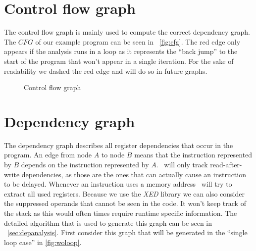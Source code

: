 \section{Control flow graph}
The control flow graph is mainly used to compute the correct dependency graph. The $CFG$ of our example program can be seen in ~\autoref{fig:cfg}. The red edge only appears if the analysis runs in a loop as it represents the ``back jump'' to the start of the program that won't appear in a single iteration. For the sake of readability we dashed the red edge and will do so in future graphs.

\begin{figure}
    \centering
    \caption{Control flow graph}
    \label{fig:cfg}
\end{figure}

\FloatBarrier

\section{Dependency graph}
The dependency graph describes all register dependencies that occur in the program. An edge from node $A$ to node $B$ means that the instruction represented by $B$ depends on the instruction represented by $A$. \suaca\ will only track read-after-write dependencies, as those are the ones that can actually cause an instruction to be delayed. Whenever an instruction uses a memory address \suaca\ will try to extract all used registers. Because we use the \emph{XED} library \cite{xed} we can also consider the suppressed operands that cannot be seen in the code. It won't keep track of the stack as this would often times require runtime specific information. The detailed algorithm that is used to generate this graph can be seen in ~\autoref{sec:depanalysis}. First consider this graph that will be generated in the ``single loop case'' in \autoref{fig:woloop}.\\


